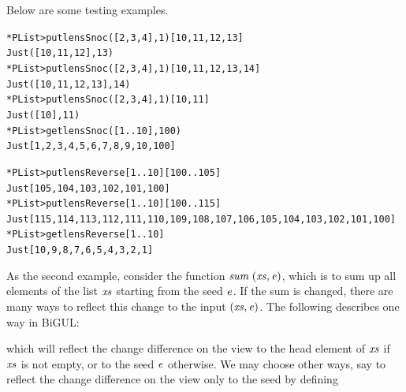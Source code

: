 {Below are some testing examples.
\begin{alltt}
*PList> put lensSnoc ([2,3,4],1) [10,11,12,13]
Just ([10,11,12],13)
*PList> put lensSnoc ([2,3,4],1) [10,11,12,13,14]
Just ([10,11,12,13],14)
*PList> put lensSnoc ([2,3,4],1) [10,11]
Just ([10],11)
*PList> get lensSnoc ([1..10], 100)
Just [1,2,3,4,5,6,7,8,9,10,100]

*PList> put lensReverse [1..10] [100..105]
Just [105,104,103,102,101,100]
*PList> put lensReverse [1..10] [100..115]
Just [115,114,113,112,111,110,109,108,107,106,105,104,103,102,101,100]
*PList> get lensReverse [1..10]
Just [10,9,8,7,6,5,4,3,2,1]
\end{alltt}

}

As the second example, consider the function \ensuremath{\Varid{sum}\;(\Varid{xs},\Varid{e})}, which is to sum up
all elements of the list \ensuremath{\Varid{xs}} starting from the seed \ensuremath{\Varid{e}}. If the sum is changed,
there are many ways to reflect this change to the input \ensuremath{(\Varid{xs},\Varid{e})}. The following
describes one way in BiGUL:
\resethooks
which will reflect the change difference on the view to the head element of \ensuremath{\Varid{xs}}
if \ensuremath{\Varid{xs}} is not empty, or to the seed \ensuremath{\Varid{e}} otherwise. We may choose other ways, say to 
reflect the change difference on the view only to the seed by defining
\resethooks
